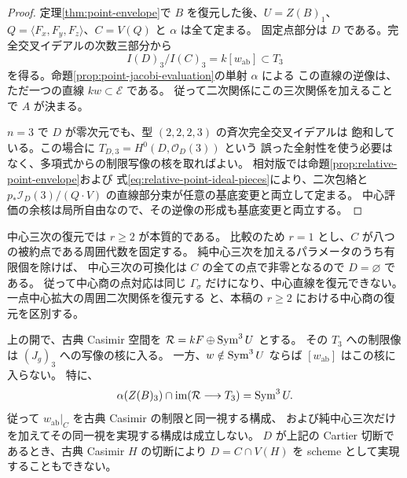 \begin{proof}
定理\ref{thm:point-envelope}で $B$ を復元した後、$U=Z(B)_1$、
$Q=\langle F_x,F_y,F_z\rangle$、$C=V(Q)$ と $\alpha$ は全て定まる。
固定点部分は $D$ である。完全交叉イデアルの次数三部分から
\[
 I(D)_3/I(C)_3=k[w_{\mathrm{ab}}]\subset T_3
\]
を得る。命題\ref{prop:point-jacobi-evaluation}の単射 $\alpha$ による
この直線の逆像は、ただ一つの直線 $kw\subset\mathcal E$ である。
従って二次関係にこの三次関係を加えることで $A$ が決まる。

$n=3$ で $D$ が零次元でも、型 $(2,2,2,3)$ の斉次完全交叉イデアルは
飽和している。この場合に $T_{D,3}=H^0(D,\mathcal O_D(3))$ という
誤った全射性を使う必要はなく、多項式からの制限写像の核を取ればよい。
相対版では命題\ref{prop:relative-point-envelope}および
式\eqref{eq:relative-point-ideal-pieces}により、二次包絡と
$p_*\mathcal I_D(3)/(Q\cdot V)$ の直線部分束が任意の基底変更と両立して定まる。
中心評価の余核は局所自由なので、その逆像の形成も基底変更と両立する。
\end{proof}

\begin{remark}[中心変数の個数と復元]
中心三次の復元では $r\ge2$ が本質的である。
比較のため $r=1$ とし、$C$ が八つの被約点である周囲代数を固定する。
純中心三次を加えるパラメータのうち有限個を除けば、
中心三次の可換化は $C$ の全ての点で非零となるので $D=\varnothing$ である。
従って中心商の点対応は同じ $\Gamma_\sigma$ だけになり、中心直線を復元できない。
一点中心拡大の周囲二次関係を復元する
\cite[Proposition~4.2.5]{LBSV}と、本稿の $r\ge2$ における中心商の復元を区別する。
\end{remark}

\begin{proposition}
\label{prop:point-casimir-restriction-obstruction}
上の開で、古典 Casimir 空間を $\mathcal R=kF\oplus\operatorname{Sym}^3U$ とする。
その $T_3$ への制限像は $(J_g)_3$ への写像の核に入る。
一方、$w\notin\operatorname{Sym}^3U$ ならば $[w_{\mathrm{ab}}]$ はこの核に入らない。
特に、
\[
 \alpha(Z(B)_3)\cap \operatorname{im}(\mathcal R\longrightarrow T_3)
 =\operatorname{Sym}^3U.
\]
従って $w_{\mathrm{ab}}|_C$ を古典 Casimir の制限と同一視する構成、
および純中心三次だけを加えてその同一視を実現する構成は成立しない。
$D$ が上記の Cartier 切断であるとき、古典 Casimir $H$ の切断により
$D=C\cap V(H)$ を scheme として実現することもできない。
\end{proposition}

